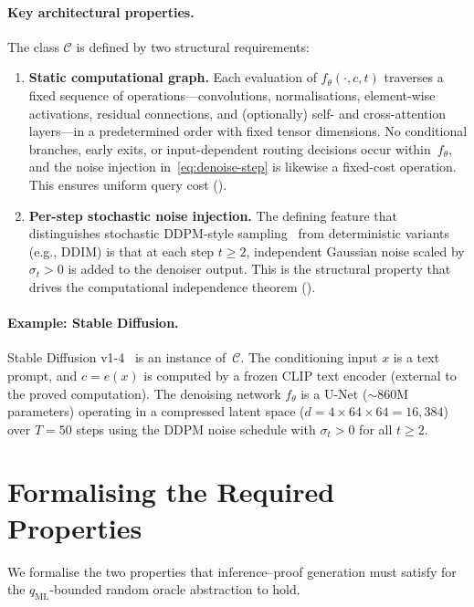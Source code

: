 \documentclass[11pt]{article}
\newcommand{\calC}{\mathcal{C}}
\begin{document}
\paragraph{Key architectural properties.}
The class $\calC$ is defined by two structural requirements:
\begin{enumerate}[label=(\alph*)]
    \item \textbf{Static computational graph.} Each evaluation of $f_\theta(\cdot, c, t)$ traverses a fixed sequence of operations---convolutions, normalisations, element-wise activations, residual connections, and (optionally) self- and cross-attention layers---in a predetermined order with fixed tensor dimensions. No conditional branches, early exits, or input-dependent routing decisions occur within~$f_\theta$, and the noise injection in~\eqref{eq:denoise-step} is likewise a fixed-cost operation. This ensures uniform query cost ().
    \item \textbf{Per-step stochastic noise injection.} The defining feature that distinguishes stochastic DDPM-style sampling~\cite{ho2020ddpm} from deterministic variants (e.g., DDIM) is that at each step $t \geq 2$, independent Gaussian noise scaled by $\sigma_t > 0$ is added to the denoiser output. This is the structural property that drives the computational independence theorem ().
\end{enumerate}

\paragraph{Example: Stable Diffusion.}
Stable Diffusion v1-4~\cite{rombach2022ldm} is an instance of~$\calC$. The conditioning input $x$ is a text prompt, and $c = e(x)$ is computed by a frozen CLIP text encoder (external to the proved computation). The denoising network $f_\theta$ is a U-Net (${\sim}860$M parameters) operating in a compressed latent space ($d = 4 \times 64 \times 64 = 16{,}384$) over $T = 50$ steps using the DDPM noise schedule with $\sigma_t > 0$ for all $t \geq 2$.


\section{Formalising the Required Properties}
\label{sec:properties}

We formalise the two properties that inference--proof generation must satisfy for the $q_{\mathrm{ML}}$-bounded random oracle abstraction to hold.
\end{document}
